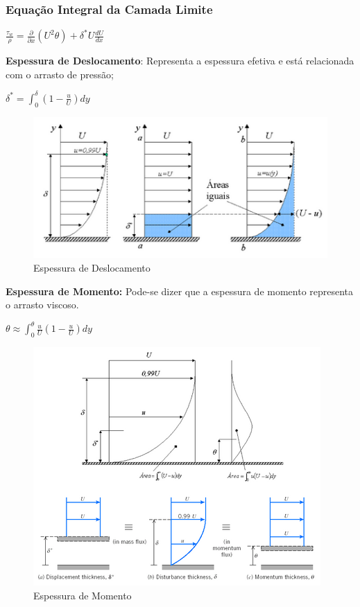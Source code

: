\documentclass[a4paper, 12pt]{article}
\begin{document}
\subsubsection{Equação Integral da Camada Limite}
	\begin{center}
		\Large
		$
		\frac{\tau_w}{\rho} = \frac{\partial}{\partial x}(U^2 \theta) + \delta^*U\frac{dU}{dx}
		$
	\end{center}
	\textbf{Espessura de Deslocamento}: Representa a espessura efetiva e está relacionada com o arrasto de pressão;\\
		\begin{center}
			$
			\delta^* = \int_{0}^{\delta}(1 - 	\frac{u}{U})dy
			$	
		\end{center}
	\begin{figure}[h]
		\centering
		\includegraphics[width=0.7\linewidth]{imagens/a}
		\caption{Espessura de Deslocamento}
		\label{fig:a}
	\end{figure}
	\textbf{Espessura de Momento:} Pode-se dizer que a espessura de momento representa o arrasto viscoso.
		\begin{center}
			$
			\theta \approx \int_{0}^{\theta} \frac{u}{U}(1 - \frac{u}{U})dy
			$
		\end{center}
	\newpage
		\begin{figure}[h]
			\centering
			\includegraphics[width=0.7\linewidth]{imagens/a1}
			\caption{Espessura de Momento}
			\label{fig:a1}
		\end{figure}
		
\end{document}
